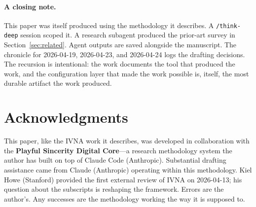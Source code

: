 \documentclass[12pt]{article}
\begin{document}
\paragraph{A closing note.} This paper was itself produced using the methodology it describes. A \texttt{/think-deep} session scoped it. A research subagent produced the prior-art survey in Section~\ref{sec:related}. Agent outputs are saved alongside the manuscript. The chronicle for 2026-04-19, 2026-04-23, and 2026-04-24 logs the drafting decisions. The recursion is intentional: the work documents the tool that produced the work, and the configuration layer that made the work possible is, itself, the most durable artifact the work produced.

\section*{Acknowledgments}

This paper, like the IVNA work it describes, was developed in collaboration with the \textbf{Playful Sincerity Digital Core}---a research methodology system the author has built on top of Claude Code (Anthropic). Substantial drafting assistance came from Claude (Anthropic) operating within this methodology. Kiel Howe (Stanford) provided the first external review of IVNA on 2026-04-13; his question about the subscripts is reshaping the framework. Errors are the author's. Any successes are the methodology working the way it is supposed to.
\end{document}
